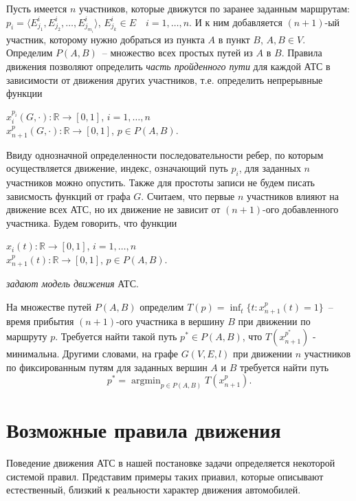 \documentclass[12pt, a4paper]{article}
\DeclareMathOperator*{\argmin}{argmin}
\begin{document}
Пусть имеется $n$ участников, которые движутся по заранее заданным маршрутам:  $ p_i = \langle E^i_{j_1}, E^i_{j_2}, \dots, E^i_{j_{m_i}} \rangle$, $ E^i_{j_k} \in E \quad i = 1, \dots, n$. И к ним добавляется $(n+1)$-ый участник, которому нужно добраться из пункта $A$ в пункт $B$, $A, B \in V$. Определим $P(A,B)$~-- множество всех простых путей из $A$ в $B$. Правила движения позволяют определить \textit{часть пройденного пути} для каждой АТС в зависимости от движения других участников, т.е. определить непрерывные функции
\begin{center}
 $x^{p_i}_i(G, \cdot ) : \mathbb {R} \rightarrow [0 , 1] $, $i = 1, \dots, n$ \\ $x^{p}_{n+1}(G, \cdot ) : \mathbb {R} \rightarrow [0 , 1]$, $p \in P(A, B) $.
\end{center}
Ввиду однозначной определенности последовательности ребер, по которым осуществляется движение, индекс, означающий путь $p_i$, для заданных $n$ участников можно опустить. Также для простоты записи не будем писать зависмость функций от графа $G$. Считаем, что первые $n$ участников влияют на движение всех АТС, но их движение не зависит от $(n+1)$-ого добавленного участника. Будем говорить, что функции 
\begin{center}
	$x_i(t) : \mathbb {R} \rightarrow [0 , 1] $, $i = 1, \dots, n$ \\ $x^{p}_{n+1}(t) : \mathbb {R} \rightarrow [0 , 1]$, $p \in P(A, B) $.
\end{center}
\textit{задают модель движения} АТС.

На множестве путей $P(A,B)$ определим $T(p) = \displaystyle \inf_t \{t : x^p_{n+1}(t) = 1\}$~-- время прибытия $(n+1)$-ого участника в вершину $B$ при движении по маршруту $p$. Требуется найти такой путь $p^* \in P(A, B)$, что $T(x^{p^*}_{n+1})$ - минимальна. Другими словами, на графе $G(V, E, l)$ при движении $n$ участников по фиксированным путям для заданных вершин $A$ и $B$ требуется найти путь
$$p^* = \argmin_{p \in P(A, B)} T(x^p_{n+1}).$$

\newpage
\section{Возможные правила движения}

Поведение движения АТС в нашей постановке задачи определяется некоторой системой правил. Представим примеры таких приавил, которые описывают естественный, близкий к реальности характер движения автомобилей.
\end{document}
